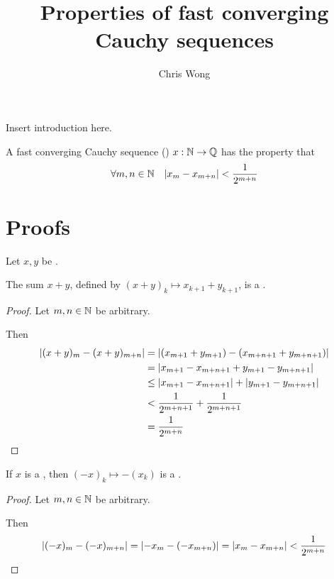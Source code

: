 \documentclass[leqno]{report}
\begin{document}
\author{Chris Wong}
\title{Properties of fast converging Cauchy sequences}
\maketitle

Insert introduction here.

\begin{Definition}
    A fast converging Cauchy sequence (\FCCS) $x : \mathbb{N} \rightarrow \mathbb{Q}$ has the property that
    \[ \forall {m, n \in \mathbb{N}} \quad { \left| x_m - x_{m+n} \right| < \frac{1}{2^{m+n}} } \]
\end{Definition}

\section{Proofs}

\begin{Proposition}[Addition]
    \label{add}
    Let $x, y$ be \FCCS.

    The sum $x + y$, defined by $(x+y)_k \mapsto x_{k+1} + y_{k+1}$, is a \FCCS.
\end{Proposition}

\begin{proof}
    Let $m, n \in \mathbb{N}$ be arbitrary.

    Then
    \begin{align*}
        \left| (x+y)_m - (x+y)_{m+n} \right|
        &= \left| (x_{m+1} + y_{m+1}) - (x_{m+n+1} + y_{m+n+1}) \right| \\
        &= \left| x_{m+1} - x_{m+n+1} + y_{m+1} - y_{m+n+1} \right| \\
        &\leq \left| x_{m+1} - x_{m+n+1} \right| + \left| y_{m+1} - y_{m+n+1} \right| \\
        &< \frac{1}{2^{m+n+1}} + \frac{1}{2^{m+n+1}} \\
        &= \frac{1}{2^{m+n}}
    \end{align*}
\end{proof}

\begin{Proposition}[Negation]
    \label{neg}
    If $x$ is a \FCCS, then $(-x)_k \mapsto -(x_k)$ is a \FCCS.
\end{Proposition}

\begin{proof}
    Let $m, n \in \mathbb{N}$ be arbitrary.

    Then
    \begin{align*}
        \left| (-x)_m - (-x)_{m+n} \right|
        = \left| -x_m - (-x_{m+n}) \right|
        = \left| x_m - x_{m+n} \right|
        < \frac{1}{2^{m+n}}
    \end{align*}
\end{proof}
\end{document}
